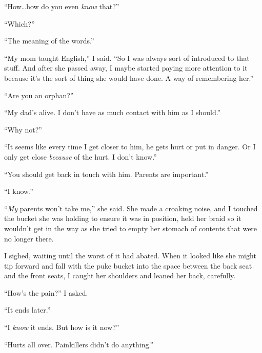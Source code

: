 ``How\ldots how do you even \emph{know} that?''



``Which?''



``The meaning of the words.''



``My mom taught English,'' I said.  ``So I was always sort of introduced to that stuff.  And after she passed away, I maybe started paying more attention to it because it's the sort of thing she would have done.  A way of remembering her.''



``Are you an orphan?''



``My dad's alive.  I don't have as much contact with him as I should.''



``Why not?''



``It seems like every time I get closer to him, he gets hurt or put in danger.  Or I only get close \emph{because }of the hurt.  I don't know.''



``You should get back in touch with him.  Parents are important.''



``I know.''



``\emph{My} parents won't take me,'' she said.  She made a croaking noise, and I touched the bucket she was holding to ensure it was in position, held her braid so it wouldn't get in the way as she tried to empty her stomach of contents that were no longer there.



I sighed, waiting until the worst of it had abated.  When it looked like she might tip forward and fall with the puke bucket into the space between the back seat and the front seats, I caught her shoulders and leaned her back, carefully.



``How's the pain?'' I asked.



``It ends later.''



``I \emph{know} it ends.  But how is it now?''



``Hurts all over.  Painkillers didn't do anything.''



